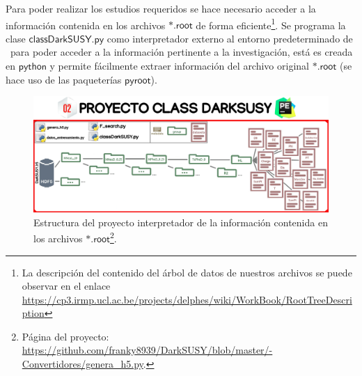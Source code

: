 

Para poder realizar los estudios requeridos se hace necesario acceder a la información contenida en los archivos $\textsf{*.root}$ de forma eficiente\footnote{La descripción del contenido del árbol de datos de nuestros archivos se puede observar en el enlace \href{https://cp3.irmp.ucl.ac.be/projects/delphes/wiki/WorkBook/RootTreeDescription}{https://\-cp3.\-irmp.\-ucl.\-ac.\-be/\-pro\-jects/\-delphes/\-wiki/\-Work\-Book/\-Root\-Tree\-Des\-crip\-tion}}. Se programa la clase $\textsf{classDarkSUSY.py}$ como interpretador externo al entorno predeterminado de \ROOT ~para poder acceder a la información pertinente a la investigación, está es creada en $\textsf{python}$ y permite fácilmente extraer información del archivo original $\textsf{*.root}$ (se hace uso de las paqueterías $\textsf{pyroot}$). %

\begin{figure}[!h]
\centering
\includegraphics[width=1\textwidth]{Cap3/imagenes/class_darksusy.png}
\caption[Estructura del proyecto interpretador de la información contenida en los archivos $\textsf{*.root}$.]{Estructura del proyecto interpretador de la información contenida en los archivos $\textsf{*.root}$\footnote{Página del proyecto: \href{https://github.com/franky8939/DarkSUSY/blob/master/00-Convertidores/genera_h5.py}{https://github.com/franky8939/\-Dark\-SUSY/\-blob/\-mas\-ter/-\-Con\-ver\-ti\-do\-res/\-ge\-ne\-ra\_h5.\-py}.}. }
\label{class_darksusy1}
\end{figure}

